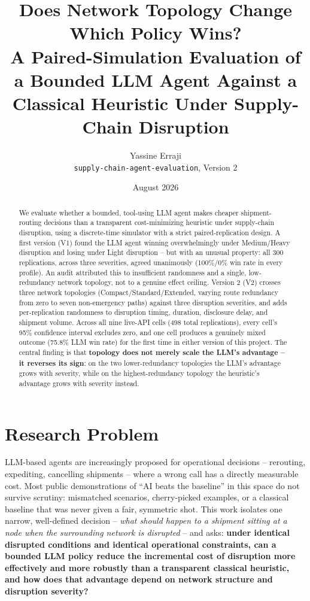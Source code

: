 \documentclass[10pt,twocolumn]{article}
\title{\vspace{-1.2em}\textbf{Does Network Topology Change Which Policy Wins?\\
\large A Paired-Simulation Evaluation of a Bounded LLM Agent Against a Classical Heuristic Under Supply-Chain Disruption}}
\author{\small Yassine Erraji \\[-2pt] \small \texttt{supply-chain-agent-evaluation}, Version 2}
\date{\small August 2026}
\begin{document}
\maketitle
\vspace{-1.8em}

\begin{abstract}
\noindent We evaluate whether a bounded, tool-using LLM agent makes cheaper shipment-routing decisions than a transparent cost-minimizing heuristic under supply-chain disruption, using a discrete-time simulator with a strict paired-replication design. A first version (V1) found the LLM agent winning overwhelmingly under Medium/Heavy disruption and losing under Light disruption -- but with an unusual property: all 300 replications, across three severities, agreed unanimously (100\%/0\% win rate in every profile). An audit attributed this to insufficient randomness and a single, low-redundancy network topology, not to a genuine effect ceiling. Version 2 (V2) crosses three network topologies (Compact/Standard/Extended, varying route redundancy from zero to seven non-emergency paths) against three disruption severities, and adds per-replication randomness to disruption timing, duration, disclosure delay, and shipment volume. Across all nine live-API cells (498 total replications), every cell's 95\% confidence interval excludes zero, and one cell produces a genuinely mixed outcome (75.8\% LLM win rate) for the first time in either version of this project. The central finding is that \textbf{topology does not merely scale the LLM's advantage -- it reverses its sign}: on the two lower-redundancy topologies the LLM's advantage grows with severity, while on the highest-redundancy topology the heuristic's advantage grows with severity instead.
\end{abstract}

\section{Research Problem}
\label{sec:intro}
LLM-based agents are increasingly proposed for operational decisions -- rerouting, expediting, cancelling shipments -- where a wrong call has a directly measurable cost. Most public demonstrations of ``AI beats the baseline'' in this space do not survive scrutiny: mismatched scenarios, cherry-picked examples, or a classical baseline that was never given a fair, symmetric shot. This work isolates one narrow, well-defined decision -- \emph{what should happen to a shipment sitting at a node when the surrounding network is disrupted} -- and asks: \textbf{under identical disrupted conditions and identical operational constraints, can a bounded LLM policy reduce the incremental cost of disruption more effectively and more robustly than a transparent classical heuristic, and how does that advantage depend on network structure and disruption severity?}
\end{document}
